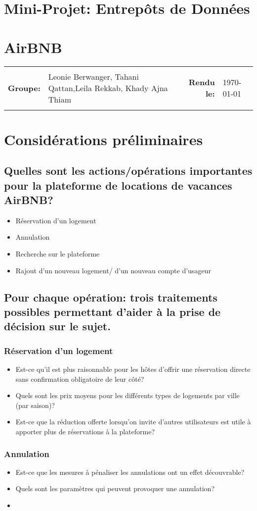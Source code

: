 \documentclass[11pt]{article}
\newcommand{\metaInfo}[4]{
	\begin{tabularx}{\textwidth}{rXrl}
	\hline \\
	\textbf{Groupe:}	& #1 &  \textbf{Rendu le:}   & #2 \\
	\\ \hline
	\end{tabularx}
}
\newcommand{\heading}[2]{
	\begin{center}
	\section*{#1}
	\section*{#2}
	\end{center}
}
\begin{document}
\heading{Mini-Projet: Entrepôts de Données}{AirBNB}
\metaInfo{Leonie Berwanger, Tahani Qattan,\newline Leila Rekkab, Khady Ajna Thiam}{\today}

\section{}
\section{Considérations préliminaires}
\subsection{Quelles sont les actions/opérations importantes pour la plateforme de locations de vacances AirBNB?}
\begin{itemize}
	\item Réservation d'un logement
	\item Annulation
	\item Recherche sur le plateforme
	\item Rajout d'un nouveau logement/ d'un nouveau compte d'usageur
\end{itemize}
\subsection{Pour chaque opération: trois traitements possibles permettant d’aider à la prise de décision sur le sujet.}
\subsubsection*{Réservation d'un logement}
\begin{itemize}
	\item Est-ce qu'il est plus raisonnable pour les hôtes d'offrir une réservation directe sans confirmation obligatoire de leur côté?
	\item Quels sont les prix moyens pour les différents types de logements par ville (par saison)?
	\item Est-ce que la réduction offerte lorsqu'on invite d'autres utilisateurs est utile à apporter plus de réservations à la plateforme?
\end{itemize}
\subsubsection*{Annulation}
\begin{itemize}
	\item Est-ce que les mesures à pénaliser les annulations ont un effet découvrable?
	\item  Quels sont les paramètres qui peuvent provoquer une annulation?
	\item 
\end{itemize}
\end{document}
